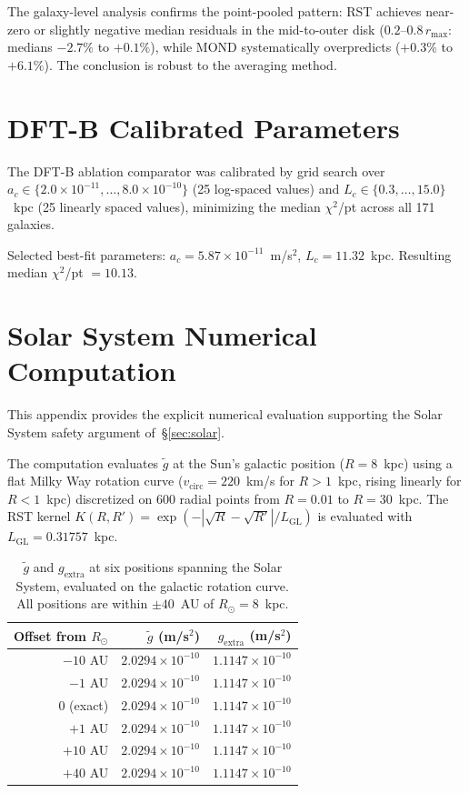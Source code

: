 \documentclass[11pt,a4paper]{article}
\begin{document}
The galaxy-level analysis confirms the point-pooled pattern: RST achieves near-zero or slightly negative median residuals in the mid-to-outer disk ($0.2$--$0.8\,r_{\max}$: medians $-2.7\%$ to $+0.1\%$), while MOND systematically overpredicts ($+0.3\%$ to $+6.1\%$).
The conclusion is robust to the averaging method.

\section{DFT-B Calibrated Parameters}
\label{app:dftb}

The DFT-B ablation comparator was calibrated by grid search over $a_c \in \{2.0 \times 10^{-11}, \ldots, 8.0 \times 10^{-10}\}$ (25 log-spaced values) and $L_c \in \{0.3, \ldots, 15.0\}$~kpc (25 linearly spaced values), minimizing the median $\chi^2$/pt across all 171 galaxies.

Selected best-fit parameters: $a_c = 5.87 \times 10^{-11}$~m/s$^2$, $L_c = 11.32$~kpc.
Resulting median $\chi^2$/pt $= 10.13$.

\section{Solar System Numerical Computation}
\label{app:solar-numerical}

This appendix provides the explicit numerical evaluation supporting the Solar System safety argument of~\S\ref{sec:solar}.

The computation evaluates $\tilde{g}$ at the Sun's galactic position ($R = 8$~kpc) using a flat Milky Way rotation curve ($v_{\mathrm{circ}} = 220$~km/s for $R > 1$~kpc, rising linearly for $R < 1$~kpc) discretized on 600 radial points from $R = 0.01$ to $R = 30$~kpc.
The RST kernel $K(R, R') = \exp(-|\sqrt{R} - \sqrt{R'}|/L_{\mathrm{GL}})$ is evaluated with $L_{\mathrm{GL}} = 0.31757$~kpc.

\begin{table}[h]
\centering
\caption{$\tilde{g}$ and $g_{\mathrm{extra}}$ at six positions spanning the Solar System, evaluated on the galactic rotation curve.
All positions are within $\pm 40$~AU of $R_\odot = 8$~kpc.}
\label{tab:solar-numerical}
\begin{tabular}{rrr}
\toprule
\textbf{Offset from $R_\odot$} & $\tilde{g}$ (m/s$^2$) & $g_{\mathrm{extra}}$ (m/s$^2$) \\
\midrule
$-10$ AU & $2.0294 \times 10^{-10}$ & $1.1147 \times 10^{-10}$ \\
$-1$ AU & $2.0294 \times 10^{-10}$ & $1.1147 \times 10^{-10}$ \\
$0$ (exact) & $2.0294 \times 10^{-10}$ & $1.1147 \times 10^{-10}$ \\
$+1$ AU & $2.0294 \times 10^{-10}$ & $1.1147 \times 10^{-10}$ \\
$+10$ AU & $2.0294 \times 10^{-10}$ & $1.1147 \times 10^{-10}$ \\
$+40$ AU & $2.0294 \times 10^{-10}$ & $1.1147 \times 10^{-10}$ \\
\bottomrule
\end{tabular}
\end{table}
\end{document}
